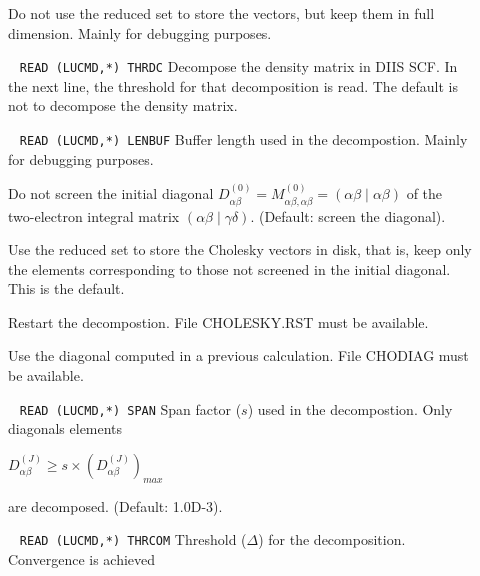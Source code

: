 \begin{description}
%
\item[] 
        Do not use the reduced set to store the vectors, but keep them in
        full dimension. Mainly for debugging purposes.
%
\item[] \verb| |\newline
\verb|READ (LUCMD,*) THRDC|\newline
        Decompose the density matrix in DIIS SCF. In the next line, the
        threshold for that decomposition is read. The default is not to
        decompose the density matrix.
%
\item[] \verb| |\newline
\verb|READ (LUCMD,*) LENBUF|\newline
        Buffer length used in the decompostion. Mainly for debugging purposes.
%
\item[] 
        Do not screen  the initial diagonal 
        $D^{(0)}_{\alpha \beta}=
         M^{(0)}_{\alpha \beta,\alpha \beta}=(\alpha \beta \mid \alpha \beta)$
        of the two-electron integral matrix $(\alpha \beta \mid \gamma \delta)$.
        (Default: screen the diagonal).
%
\item[] 
        Use the reduced set to store the Cholesky vectors in disk, that is, keep
        only the elements corresponding to those not screened in the initial
        diagonal. This is the default.
%
\item[]
        Restart the decompostion. File CHOLESKY.RST must be available.
%
\item[]
        Use the diagonal computed in a previous calculation. File CHODIAG
        must be available.
%
\item[] \verb| |\newline
\verb|READ (LUCMD,*) SPAN|\newline
        Span factor ($s$) used in the decompostion. Only diagonals elements 
        \newline 
        \begin{center}
        $D^{(J)}_{\alpha \beta} \geq s \times (D^{(J)}_{\alpha \beta})_{max}$
        \end{center}
        are decomposed. (Default: 1.0D-3).
%
\item[] \verb| |\newline
\verb|READ (LUCMD,*) THRCOM|\newline
        Threshold ($\Delta$) for the decomposition. Convergence is achieved 

\end{description}
